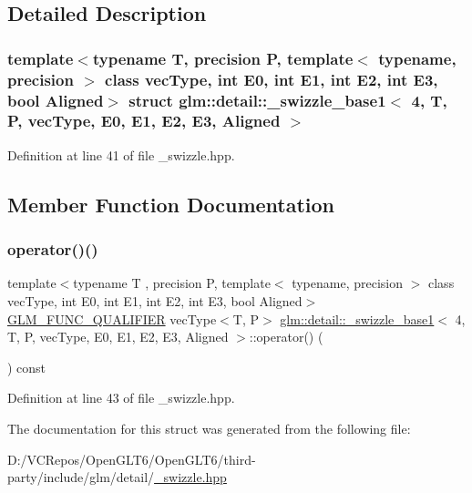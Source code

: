\subsection{Detailed Description}
\subsubsection*{template$<$typename T, precision P, template$<$ typename, precision $>$ class vec\+Type, int E0, int E1, int E2, int E3, bool Aligned$>$\newline
struct glm\+::detail\+::\+\_\+swizzle\+\_\+base1$<$ 4, T, P, vec\+Type, E0, E1, E2, E3, Aligned $>$}



Definition at line 41 of file \+\_\+swizzle.\+hpp.



\subsection{Member Function Documentation}
\mbox{\label{structglm_1_1detail_1_1__swizzle__base1_3_014_00_01_t_00_01_p_00_01vec_type_00_01_e0_00_01_e1_0074d83cdf10610a072bf3157b31203824_a497e2bc364ab338474943fc655f69f1e}} 
\subsubsection{\texorpdfstring{operator()()}{operator()()}}
{\footnotesize\ttfamily template$<$typename T , precision P, template$<$ typename, precision $>$ class vec\+Type, int E0, int E1, int E2, int E3, bool Aligned$>$ \\
\mbox{\hyperlink{setup_8hpp_a33fdea6f91c5f834105f7415e2a64407}{G\+L\+M\+\_\+\+F\+U\+N\+C\+\_\+\+Q\+U\+A\+L\+I\+F\+I\+ER}} vec\+Type$<$T, P$>$ \mbox{\hyperlink{structglm_1_1detail_1_1__swizzle__base1}{glm\+::detail\+::\+\_\+swizzle\+\_\+base1}}$<$ 4, T, P, vec\+Type, E0, E1, E2, E3, Aligned $>$\+::operator() (\begin{DoxyParamCaption}{ }\end{DoxyParamCaption}) const\hspace{0.3cm}{\ttfamily [inline]}}



Definition at line 43 of file \+\_\+swizzle.\+hpp.



The documentation for this struct was generated from the following file\+:\begin{DoxyCompactItemize}
\item 
D\+:/\+V\+C\+Repos/\+Open\+G\+L\+T6/\+Open\+G\+L\+T6/third-\/party/include/glm/detail/\mbox{\hyperlink{__swizzle_8hpp}{\+\_\+swizzle.\+hpp}}\end{DoxyCompactItemize}
